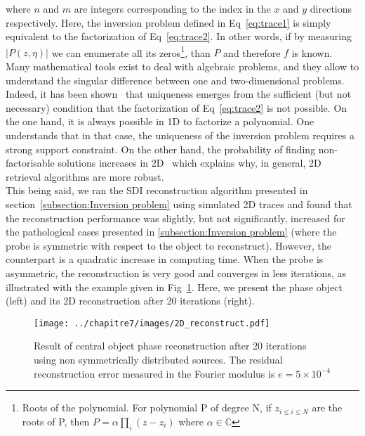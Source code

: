 \noindent where $n$ and $m$ are integers corresponding to the index in the $x$ and $y$ directions respectively. Here, the inversion problem defined in  Eq~\ref{eq:trace1} is simply equivalent to the factorization of Eq~\ref{eq:trace2}. In other words, if by measuring $|P(z,\eta)|$ we can enumerate all its zeros\footnote{Roots of the polynomial. For polynomial P of degree N, if $z_{i\le i \le N}$ are the roots of P, then $P = \alpha \prod_{i} (z-z_i)$ where $\alpha \in \mathbb{C}$}, than $P$ and therefore $f$ is known. Many mathematical tools exist to deal with algebraic problems, and they allow to understand the singular difference between one and two-dimensional problems. Indeed, it has been shown~\cite{bruck1979ambiguity} that uniqueness emerges from the sufficient (but not necessary) condition that the factorization of Eq~\ref{eq:trace2} is not possible. On the one hand, it is always possible in 1D to factorize a polynomial. One understands that in that case, the uniqueness of the inversion problem requires a strong support constraint. On the other hand, the probability of finding non-factorisable solutions increases in 2D~\cite{bose1982applied,tzafestas1986state} which explains why, in general, 2D retrieval algorithms are more robust. \\

\noindent This being said, we ran the SDI reconstruction algorithm presented in section~\ref{subsection:Inversion problem} using simulated 2D traces and found that the reconstruction performance was slightly, but not significantly, increased for the pathological cases presented in \ref{subsection:Inversion problem} (where the probe is symmetric with respect to the object to reconstruct). However, the counterpart is a quadratic increase in computing time. When the probe is asymmetric, the reconstruction is very good and converges in less iterations, as illustrated with the example given in Fig~\ref{fig:2D_reconstruct}. Here, we present the phase object (left) and its 2D reconstruction after 20 iterations (right).

 \begin{figure}[H]
\centering
\texttt{[image: ../chapitre7/images/2D\_reconstruct.pdf]}\\
\caption{\label{fig:2D_reconstruct} Result of central object phase reconstruction after 20 iterations using non symmetrically distributed sources. The residual reconstruction error measured in the Fourier modulus is $e = 5\times 10^{-4}$}
\end{figure}





